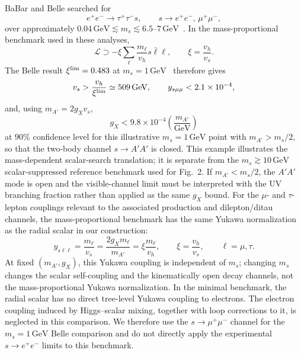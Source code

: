 \documentclass[12pt,a4paper]{article}
\begin{document}
BaBar and Belle searched for
\[
e^+e^-\to\tau^+\tau^-s,\qquad
s\to e^+e^-,\,\mu^+\mu^-,
\]
over approximately \(0.04\,\mathrm{GeV}\lesssim m_s\lesssim6.5\text{--}7\,\mathrm{GeV}\)~\cite{BaBar:2020jma,Belle:2022gbl}. In the mass-proportional benchmark used in these analyses,
\[
\mathcal L\supset-\xi\sum_\ell\frac{m_\ell}{v_h}s\bar\ell\ell,
\qquad \xi=\frac{v_h}{v_s}.
\]
The Belle result \(\xi^{\rm lim}=0.483\) at \(m_s=1\,\mathrm{GeV}\)~\cite{Belle:2022gbl} therefore gives
\[
v_s>\frac{v_h}{\xi^{\rm lim}}\simeq509\,\mathrm{GeV},
\qquad
y_{s\mu\mu}<2.1\times10^{-4},
\]
and, using \(m_{A'}=2g_Xv_s\),
\[
g_X<9.8\times10^{-4}
\left(\frac{m_{A'}}{\mathrm{GeV}}\right)
\]
at \(90\%\) confidence level for this illustrative \(m_s=1\,\mathrm{GeV}\) point with \(m_{A'}>m_s/2\), so that the two-body channel \(s\to A'A'\) is closed. This example illustrates the mass-dependent scalar-search translation; it is separate from the \(m_s\gtrsim10\,\mathrm{GeV}\) scalar-suppressed reference benchmark used for Fig.~2. If \(m_{A'}<m_s/2\), the \(A'A'\) mode is open and the visible-channel limit must be interpreted with the UV branching fraction rather than applied as the same \(g_X\) bound. For the \(\mu\)- and \(\tau\)-lepton couplings relevant to the associated production and dilepton/ditau channels, the mass-proportional benchmark has the same Yukawa normalization as the radial scalar in our construction:
\[
y_{s\ell\ell}=\frac{m_\ell}{v_s}
=\frac{2g_Xm_\ell}{m_{A'}}
=\xi\frac{m_\ell}{v_h},
\qquad
\xi=\frac{v_h}{v_s},
\qquad \ell=\mu,\tau.
\]
At fixed \((m_{A'},g_X)\), this Yukawa coupling is independent of \(m_s\); changing \(m_s\) changes the scalar self-coupling and the kinematically open decay channels, not the mass-proportional Yukawa normalization. In the minimal benchmark, the radial scalar has no direct tree-level Yukawa coupling to electrons. The electron coupling induced by Higgs--scalar mixing, together with loop corrections to it, is neglected in this comparison. We therefore use the \(s\to\mu^+\mu^-\) channel for the \(m_s=1\,\mathrm{GeV}\) Belle comparison and do not directly apply the experimental \(s\to e^+e^-\) limits to this benchmark.
\end{document}
